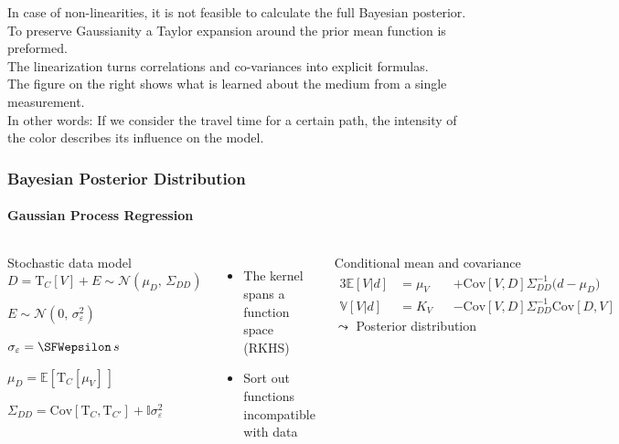 \documentclass[aspectratio=169, t, 10pt, ]{beamer}
\newcommand\Mean[1]{\mathbb{E}\!\left[#1\right]}
\newcommand\Var[1]{\mathbb{V}\!\left[#1\right]}
\newcommand\Cov[2]{\mathrm{Cov}\!\left[#1,#2\right]}
\newcommand\Gauss[2]{\mathcal{N}\!\left({#1},\,{#2}\right)}
\newcommand{\Identity}{\mathbb{I}}
\begin{document}
In case of non-linearities, it is not feasible to calculate the full Bayesian posterior.
\\
To preserve Gaussianity a Taylor expansion around the prior mean function is preformed.
\\
The linearization turns correlations and co-variances into explicit formulas.
\\[2mm]

The figure on the right shows what is learned about the medium from a single measurement.
\\
In other words: If we consider the travel time for a certain path, the intensity of the color describes its influence on the model.


\begin{frame}
    \frametitle{Bayesian Posterior Distribution}
    \framesubtitle{Gaussian Process Regression}

\begin{columns}

    \begin{block}{Stochastic data model}
        \begin{equation}
            D = \mathrm T_C[V] + E \sim \Gauss{\mu_D}{\Sigma_{DD}}
        \end{equation}
        \begin{description}[labelwidth=25mm]
            \item [Error model]        $E\sim \Gauss{0}{\sigma_\varepsilon^2}$
            \item [Uncertainty]        $\sigma_\varepsilon = \SFWepsilon\,s$
            \item [Prior travel times] $\mu_D = \Mean{\mathrm T_C[\mu_V]\,}$
            \item [Covariance matrix]  $\Sigma_{DD} = \Cov{\mathrm T_C}{\mathrm T_{C'}} + \Identity \sigma_\varepsilon^2$
        \end{description}
    \end{block}

    \begin{itemize}
        \item The kernel spans a function space (RKHS)
        \item Sort out functions incompatible with data
    \end{itemize}


    \begin{exampleblock}{Conditional mean and covariance}
        \setlength\abovedisplayskip{0pt}
        \begin{alignat}{3}
            \Mean{V|d} &= \mu_V &&+ \Cov VD \Sigma_{DD}^{-1} \big( d - \mu_{D} \big)
            \\
            \Var{V|d}  &= K_V   &&- \Cov VD \Sigma_{DD}^{-1} \Cov DV
        \end{alignat}
        \hfill {\Large $\leadsto$} Posterior distribution \phantom{p}
    \end{exampleblock}


\end{columns}
\end{frame}
\end{document}
